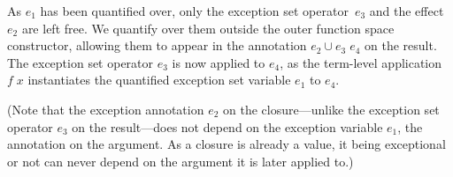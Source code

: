 \documentclass{llncs}
\newcommand{\Varid}[1]{\mathit{#1}}
\begin{document}
\begin{example}
As \ensuremath{\Varid{e}_{\mathrm{1}}} has been quantified over, only the exception set operator~\ensuremath{\Varid{e}_{\mathrm{3}}} and the effect \ensuremath{\Varid{e}_{\mathrm{2}}} are left free. We quantify over them outside the outer function space constructor, allowing them to appear in the annotation \ensuremath{\Varid{e}_{\mathrm{2}}\cup \Varid{e}_{\mathrm{3}}\;\Varid{e}_{\mathrm{4}}} on the result. The exception set operator \ensuremath{\Varid{e}_{\mathrm{3}}} is now applied to \ensuremath{\Varid{e}_{\mathrm{4}}}, as the term-level application \ensuremath{\Varid{f}\;\Varid{x}} instantiates the quantified exception set variable \ensuremath{\Varid{e}_{\mathrm{1}}} to \ensuremath{\Varid{e}_{\mathrm{4}}}.

(Note that the exception annotation $e_2$ on the closure---unlike the exception set operator $e_3$ on the result---does not depend on the exception variable $e_1$, the annotation on the argument. As a closure is already a value, it being exceptional or not can never depend on the argument it is later applied to.)
\end{example}
\end{document}
